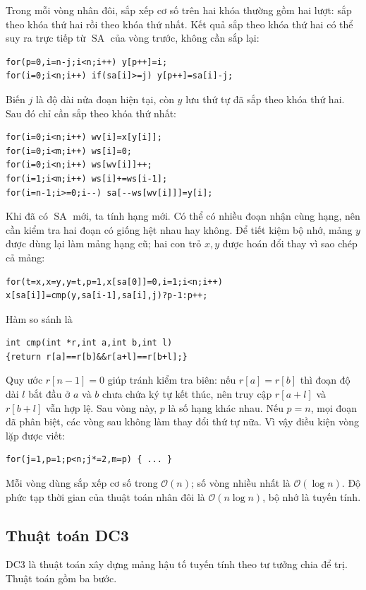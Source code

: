 \documentclass[11pt]{article}
\newcommand{\Oh}{\mathcal{O}}
\newcommand{\SA}{\operatorname{SA}}
\begin{document}
Trong mỗi vòng nhân đôi, sắp xếp cơ số trên hai khóa thường gồm hai lượt:
sắp theo khóa thứ hai rồi theo khóa thứ nhất. Kết quả sắp theo khóa thứ hai
có thể suy ra trực tiếp từ \(\SA\) của vòng trước, không cần sắp lại:
\begin{verbatim}
for(p=0,i=n-j;i<n;i++) y[p++]=i;
for(i=0;i<n;i++) if(sa[i]>=j) y[p++]=sa[i]-j;
\end{verbatim}
Biến \(j\) là độ dài nửa đoạn hiện tại, còn \(y\) lưu thứ tự đã sắp theo khóa
thứ hai. Sau đó chỉ cần sắp theo khóa thứ nhất:
\begin{verbatim}
for(i=0;i<n;i++) wv[i]=x[y[i]];
for(i=0;i<m;i++) ws[i]=0;
for(i=0;i<n;i++) ws[wv[i]]++;
for(i=1;i<m;i++) ws[i]+=ws[i-1];
for(i=n-1;i>=0;i--) sa[--ws[wv[i]]]=y[i];
\end{verbatim}

Khi đã có \(\SA\) mới, ta tính hạng mới. Có thể có nhiều đoạn nhận cùng hạng,
nên cần kiểm tra hai đoạn có giống hệt nhau hay không. Để tiết kiệm bộ nhớ,
mảng \(y\) được dùng lại làm mảng hạng cũ; hai con trỏ \(x,y\) được hoán đổi
thay vì sao chép cả mảng:
\begin{verbatim}
for(t=x,x=y,y=t,p=1,x[sa[0]]=0,i=1;i<n;i++)
x[sa[i]]=cmp(y,sa[i-1],sa[i],j)?p-1:p++;
\end{verbatim}
Hàm so sánh là
\begin{verbatim}
int cmp(int *r,int a,int b,int l)
{return r[a]==r[b]&&r[a+l]==r[b+l];}
\end{verbatim}
Quy ước \(r[n-1]=0\) giúp tránh kiểm tra biên: nếu \(r[a]=r[b]\) thì đoạn độ
dài \(l\) bắt đầu ở \(a\) và \(b\) chưa chứa ký tự kết thúc, nên truy cập
\(r[a+l]\) và \(r[b+l]\) vẫn hợp lệ. Sau vòng này, \(p\) là số hạng khác
nhau. Nếu \(p=n\), mọi đoạn đã phân biệt, các vòng sau không làm thay đổi thứ
tự nữa. Vì vậy điều kiện vòng lặp được viết:
\begin{verbatim}
for(j=1,p=1;p<n;j*=2,m=p) { ... }
\end{verbatim}

Mỗi vòng dùng sắp xếp cơ số trong \(\Oh(n)\); số vòng nhiều nhất là
\(\Oh(\log n)\). Độ phức tạp thời gian của thuật toán nhân đôi là
\(\Oh(n\log n)\), bộ nhớ là tuyến tính.

\subsection{Thuật toán DC3}

DC3 là thuật toán xây dựng mảng hậu tố tuyến tính theo tư tưởng chia để trị.
Thuật toán gồm ba bước.
\end{document}
